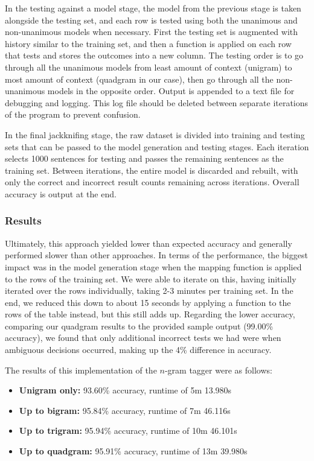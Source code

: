 In the testing against a model stage, the model from the previous stage is taken alongside the testing set, and each row is tested using both the unanimous and non-unanimous models when necessary. First the testing set is augmented with history similar to the training set, and then a function is applied on each row that tests and stores the outcomes into a new column. The testing order is to go through all the unanimous models from least amount of context (unigram) to most amount of context (quadgram in our case), then go through all the non-unanimous models in the opposite order. Output is appended to a text file for debugging and logging. This log file should be deleted between separate iterations of the program to prevent confusion.

In the final jackknifing stage, the raw dataset is divided into training and testing sets that can be passed to the model generation and testing stages. Each iteration selects 1000 sentences for testing and passes the remaining sentences as the training set. Between iterations, the entire model is discarded and rebuilt, with only the correct and incorrect result counts remaining across iterations. Overall accuracy is output at the end.

\subsubsection{Results}
Ultimately, this approach yielded lower than expected accuracy and generally performed slower than other approaches. In terms of the performance, the biggest impact was in the model generation stage when the mapping function is applied to the rows of the training set. We were able to iterate on this, having initially iterated over the rows individually, taking 2-3 minutes per training set. In the end, we reduced this down to about 15 seconds by applying a function to the rows of the table instead, but this still adds up. Regarding the lower accuracy, comparing our quadgram results to the provided sample output (99.00\% accuracy), we found that only additional incorrect tests we had were when ambiguous decisions occurred, making up the 4\% difference in accuracy. 

The results of this implementation of the $n$-gram tagger were as follows:
\begin{itemize}
    \item \textbf{Unigram only:} 93.60\% accuracy, runtime of 5m 13.980s
    \item \textbf{Up to bigram:} 95.84\% accuracy, runtime of 7m 46.116s
    \item \textbf{Up to trigram:} 95.94\% accuracy, runtime of 10m 46.101s
    \item \textbf{Up to quadgram:} 95.91\% accuracy, runtime of 13m 39.980s
\end{itemize}